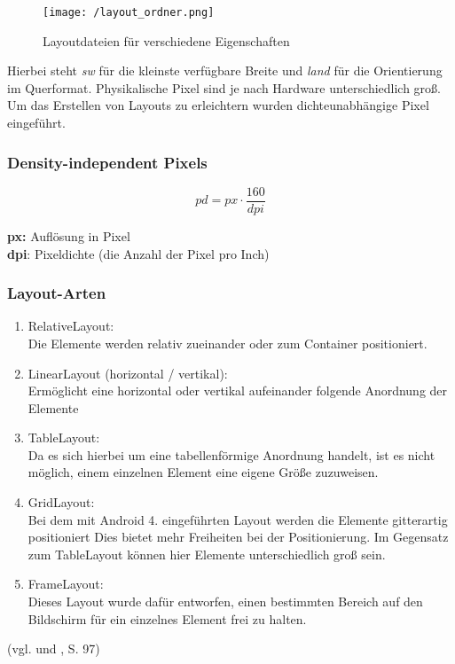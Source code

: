 \begin{figure}[H]
\centering
\texttt{[image: /layout\_ordner.png]}
\caption{Layoutdateien für verschiedene Eigenschaften}
\label{fig:layout_ordner}
\end{figure}

Hierbei steht \emph{sw} für die kleinste verfügbare Breite und \emph{land} für die Orientierung
im Querformat. Physikalische Pixel sind je nach Hardware unterschiedlich groß. Um das
Erstellen von Layouts zu erleichtern wurden dichteunabhängige Pixel eingeführt.

\subsubsection*{Density-independent Pixels}
\begin{equation}
pd = px \cdot \frac{160}{dpi}
\end{equation}

\addvspace{2ex}
\textbf{px:} Auflösung in Pixel\\
\textbf{dpi}: Pixeldichte (die Anzahl der Pixel pro Inch)\\


\subsubsection*{Layout-Arten}

\begin{enumerate}
   \item RelativeLayout:\\
      Die Elemente werden relativ zueinander oder zum Container positioniert.
   \item LinearLayout (horizontal / vertikal):\\
      Ermöglicht eine horizontal oder vertikal aufeinander folgende Anordnung der Elemente 
   \item TableLayout:\\
      Da es sich hierbei um eine tabellenförmige Anordnung handelt, ist es nicht möglich,
      einem einzelnen Element eine eigene Größe zuzuweisen.
   \item GridLayout:\\
      Bei dem mit Android 4. eingeführten Layout werden die Elemente gitterartig positioniert
      Dies bietet mehr Freiheiten bei der Positionierung. Im Gegensatz zum TableLayout können hier
      Elemente unterschiedlich groß sein.
   \item FrameLayout:\\
      Dieses Layout wurde dafür entworfen, einen bestimmten Bereich auf den Bildschirm für ein
      einzelnes Element frei zu halten.
\end{enumerate}
(vgl. \cite{ADevLayout} und \cite{AppsProg}, S. 97)

